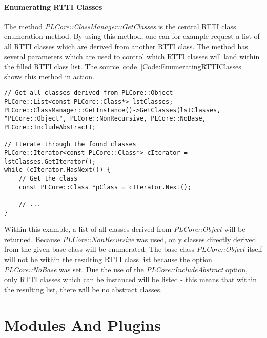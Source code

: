 \paragraph{Enumerating RTTI Classes}
The method \emph{PLCore::ClassManager::GetClasses} is the central RTTI class enumeration method. By using this method, one can for example request a list of all RTTI classes which are derived from another RTTI class. The method has several parameters which are used to control which RTTI classes will land within the filled RTTI class list. The source~code~\ref{Code:EnumeratingRTTIClasses} shows this method in action.
\begin{lstlisting}[float=htb,label=Code:EnumeratingRTTIClasses,caption={Enumerating RTTI classes}]
// Get all classes derived from PLCore::Object
PLCore::List<const PLCore::Class*> lstClasses;
PLCore::ClassManager::GetInstance()->GetClasses(lstClasses, "PLCore::Object", PLCore::NonRecursive, PLCore::NoBase, PLCore::IncludeAbstract);

// Iterate through the found classes
PLCore::Iterator<const PLCore::Class*> cIterator = lstClasses.GetIterator();
while (cIterator.HasNext()) {
	// Get the class
	const PLCore::Class *pClass = cIterator.Next();

	// ...
}
\end{lstlisting}
Within this example, a list of all classes derived from \emph{PLCore::Object} will be returned. Because \emph{PLCore::NonRecursive} was used, only classes directly derived from the given base class will be enumerated. The base class \emph{PLCore::Object} itself will not be within the resulting RTTI class list because the option \emph{PLCore::NoBase} was set. Due the use of the \emph{PLCore::IncludeAbstract} option, only RTTI classes which can be instanced will be listed - this means that within the resulting list, there will be no abstract classes.




\section{Modules And Plugins}
